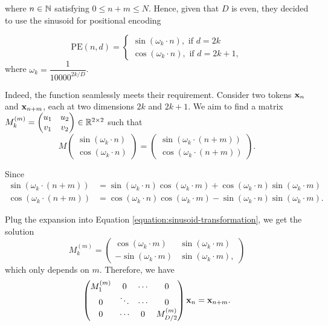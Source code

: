 where $n\in\mathbb{N}$ satisfying $0\le n+m\le N$. Hence, given that $D$ is even, they decided to use the sinusoid for positional encoding

$$\mathrm{PE}(n,d) =
  \begin{cases}
    \sin(\omega_k\cdot n), \text{ if } d = 2k \\
    \cos(\omega_k\cdot n), \text{ if } d = 2k+1,
  \end{cases}$$
where $\omega_k = \dfrac{1}{10000^{2k/D}}$.

Indeed, the function seamlessly meets their requirement. Consider two tokens $\mathbf{x}_n$ and $\mathbf{x}_{n+m}$, each at two dimensions $2k$ and $2k+1$. We aim to find a matrix $M^{(m)}_k=\begin{pmatrix}u_1 & u_2 \\ v_1 & v_2\end{pmatrix}\in\mathbb{R}^{2\times2}$ such that
\begin{equation}
  \label{equation:sinusoid-transformation}
  M\begin{pmatrix}
    \sin(\omega_k\cdot n) \\
    \cos(\omega_k\cdot n)
  \end{pmatrix} = \begin{pmatrix}
    \sin(\omega_k\cdot (n+m)) \\
    \cos(\omega_k\cdot (n+m))
  \end{pmatrix}.
\end{equation}

Since
\begin{align*}
  \sin(\omega_k\cdot (n+m)) & = \sin(\omega_k\cdot n)\cos(\omega_k\cdot m) + \cos(\omega_k\cdot n)\sin(\omega_k\cdot m)  \\
  \cos(\omega_k\cdot (n+m)) & = \cos(\omega_k\cdot n)\cos(\omega_k\cdot m) - \sin(\omega_k\cdot n)\sin(\omega_k\cdot m).
\end{align*}

Plug the expansion into Equation \ref{equation:sinusoid-transformation}, we get the solution
\begin{equation}
  M^{(m)}_k =
  \begin{pmatrix}
    \cos(\omega_k\cdot m)  & \sin(\omega_k\cdot m)  \\
    -\sin(\omega_k\cdot m) & \sin(\omega_k\cdot m),
  \end{pmatrix}
\end{equation}
which only depends on $m$. Therefore, we have
\begin{equation}
  \begin{pmatrix}
    M^{(m)}_1 & 0      & \cdots & 0             \\
    0         & \ddots & \cdots & 0             \\
    0         & \cdots & 0      & M^{(m)}_{D/2}
  \end{pmatrix} \mathbf{x}_n = \mathbf{x}_{n+m}.
\end{equation}

